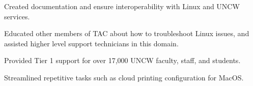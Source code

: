 \begin{cventries}
{\begin{cvsubentries}
{\begin{cvsubitems}
            \item {Created documentation and ensure interoperability with Linux and UNCW services.}
            \item {
                Educated other members of TAC about how to troubleshoot Linux
                issues, and assisted higher level support technicians in this
                domain.
              }
          \end{cvsubitems}
        }
        {
          \begin{cvsubitems}
            \item {Provided Tier 1 support for over 17,000 UNCW faculty, staff, and students.}
            \item {Streamlined repetitive tasks such as cloud printing configuration for MacOS.}
          \end{cvsubitems}
        }
      \end{cvsubentries}
    }
\end{cventries}
